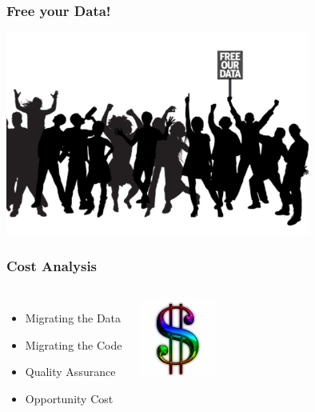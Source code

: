 \documentclass{beamer}
\begin{document}
\begin{frame}[fragile]
  \frametitle{Free your Data!}

\begin{center}
  \includegraphics[height=18em]{free-our-open-data.jpg}
\end{center}
\end{frame}

\begin{frame}[fragile]
  \frametitle{Cost Analysis}
  
  \vfill

\begin{columns}

  \begin{itemize}
  \item Migrating the Data
  \item Migrating the Code
  \item Quality Assurance
  \item Opportunity Cost
  \end{itemize}  

\begin{center}
  \includegraphics[height=7em]{Dollar-sign.jpg}
\end{center}
\end{columns}
\end{frame}
\end{document}
